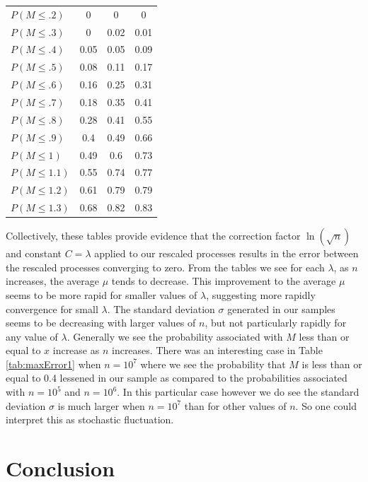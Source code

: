 \documentclass[12pt]{article}
\theoremstyle{plain}
\theoremstyle{definition}
\theoremstyle{remark}
\begin{document}
\begin{table}[H]
\begin{center}
\begin{minipage}[t]{6.5cm}
\begin{tabular}[t]{| l | c | c | c|}
$P(M\leq .2)$&0&0&0\\
$P(M\leq.3)$&0&0.02&0.01\\
$P(M\leq.4)$&0.05&0.05&0.09\\
$P(M\leq.5)$&0.08&0.11&0.17\\
$P(M\leq.6)$&0.16&0.25&0.31\\
$P(M\leq.7)$&0.18&0.35&0.41\\
$P(M\leq.8)$&0.28&0.41&0.55\\
$P(M\leq.9)$&0.4&0.49&0.66\\
$P(M\leq1)$&0.49&0.6&0.73\\
$P(M\leq1.1)$&0.55&0.74&0.77\\
$P(M\leq1.2)$&0.61&0.79&0.79\\
$P(M\leq1.3)$&0.68&0.82&0.83\\
\hline
\end{tabular}
\end{minipage}
\end{center}
\end{table}

Collectively, these tables provide evidence that the correction factor $\ln( \sqrt{n})$ and constant $C=\lambda$ applied to our rescaled processes results in the error between the rescaled processes converging to zero. From the tables we see for each $\lambda$, as $n$ increases, the average $\mu$ tends to decrease. This improvement to the average $\mu$ seems to be more rapid for smaller values of $\lambda$, suggesting more rapidly convergence for small $\lambda$. The standard deviation $\sigma$ generated in our samples seems to be decreasing with larger values of $n$, but not particularly rapidly for any value of $\lambda$. Generally we see the probability associated with $M$ less than or equal to $x$ increase as $n$ increases. There was an interesting case in Table \ref{tab:maxError1} when $n=10^7$ where we see the probability that $M$ is less than or equal to 0.4 lessened in our sample as compared to the probabilities associated with $n=10^5$ and $n=10^6$. In this particular case however we do see the standard deviation $\sigma$ is much larger when $n=10^7$ than for other values of $n$. So one could interpret this as stochastic fluctuation.

\section{Conclusion}
\end{document}
